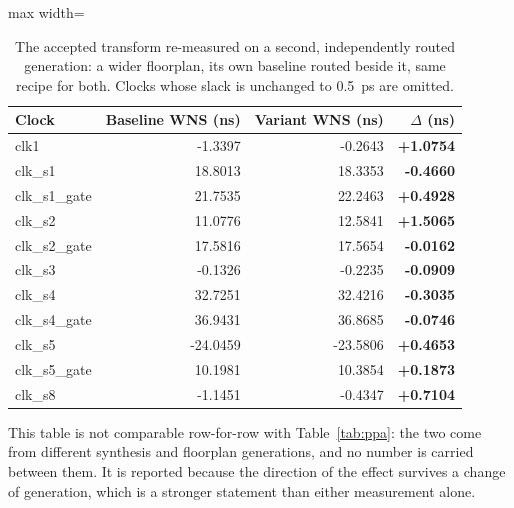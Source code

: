 \begin{table}[htbp]
  \centering
  \footnotesize
  \caption{The accepted transform re-measured on a second, independently routed generation: a wider floorplan, its own baseline routed beside it, same recipe for both. Clocks whose slack is unchanged to \SI{0.5}{\pico\second} are omitted.}
  \label{tab:v3}
  \begin{adjustbox}{max width=\textwidth}
  \begin{tabular}{lrrr}
    \toprule
    \textbf{Clock} & \textbf{Baseline WNS (ns)} & \textbf{Variant WNS (ns)} & \textbf{$\Delta$ (ns)} \\
    \midrule
    clk1 & -1.3397 & -0.2643 & \textbf{+1.0754} \\
    clk\_s1 & 18.8013 & 18.3353 & \textbf{-0.4660} \\
    clk\_s1\_gate & 21.7535 & 22.2463 & \textbf{+0.4928} \\
    clk\_s2 & 11.0776 & 12.5841 & \textbf{+1.5065} \\
    clk\_s2\_gate & 17.5816 & 17.5654 & \textbf{-0.0162} \\
    clk\_s3 & -0.1326 & -0.2235 & \textbf{-0.0909} \\
    clk\_s4 & 32.7251 & 32.4216 & \textbf{-0.3035} \\
    clk\_s4\_gate & 36.9431 & 36.8685 & \textbf{-0.0746} \\
    clk\_s5 & -24.0459 & -23.5806 & \textbf{+0.4653} \\
    clk\_s5\_gate & 10.1981 & 10.3854 & \textbf{+0.1873} \\
    clk\_s8 & -1.1451 & -0.4347 & \textbf{+0.7104} \\
    \bottomrule
  \end{tabular}
  \end{adjustbox}
  \par\smallskip\footnotesize\raggedright This table is not comparable row-for-row with Table~\ref{tab:ppa}: the two come from different synthesis and floorplan generations, and no number is carried between them. It is reported because the direction of the effect survives a change of generation, which is a stronger statement than either measurement alone.
\end{table}
